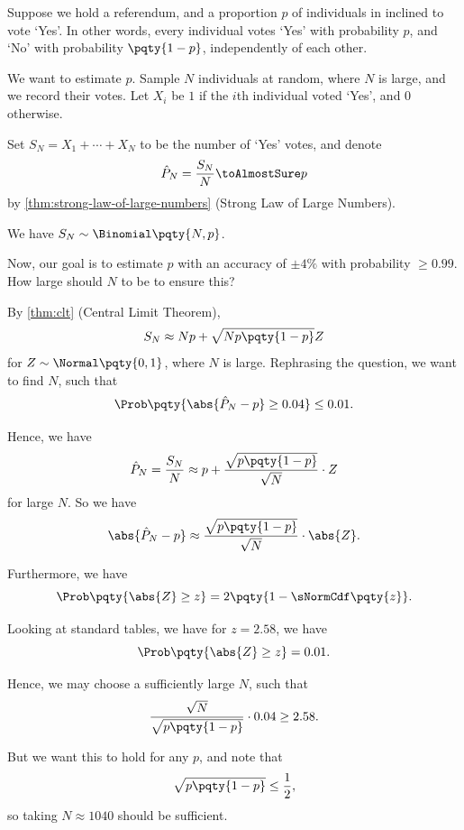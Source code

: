 \begin{example}
    Suppose we hold a referendum, and a proportion \(p\) of individuals in inclined to vote `Yes'. In other words, every individual votes `Yes' with probability \(p\), and `No' with probability \(\pqty{1 - p}\), independently of each other.

    We want to estimate \(p\). Sample \(N\) individuals at random, where \(N\) is large, and we record their votes. Let \(X_i\) be \(1\) if the \(i\)th individual voted `Yes', and \(0\) otherwise.

    Set \(S_N = X_1 + \cdots + X_N\) to be the number of `Yes' votes, and denote
    \[
        \hat{P}_N = \frac{S_N}{N} \toAlmostSure p
    \]
    by \autoref{thm:strong-law-of-large-numbers} (Strong Law of Large Numbers).
    
    We have \(S_N \sim \Binomial\pqty{N, p}\).
    
    Now, our goal is to estimate \(p\) with an accuracy of \(\pm 4\%\) with probability \(\geq 0.99\). How large should \(N\) to be to ensure this?

    By \autoref{thm:clt} (Central Limit Theorem),
    \[
        S_N \approx Np + \sqrt{N p \pqty{1 - p}} Z
    \]
    for \(Z \sim \Normal\pqty{0, 1}\), where \(N\) is large. Rephrasing the question, we want to find \(N\), such that
    \[
        \Prob\pqty{\abs{\hat{P}_N - p} \geq 0.04} \leq 0.01.
    \]

    Hence, we have
    \[
        \hat{P}_N = \frac{S_N}{N} \approx p + \frac{\sqrt{p \pqty{1 - p}}}{\sqrt{N}} \cdot Z
    \]  
    for large \(N\). So we have
    \[
        \abs{\hat{P}_N - p} \approx \frac{\sqrt{p \pqty{1 - p}}}{\sqrt{N}} \cdot \abs{Z}.
    \]

    Furthermore, we have
    \[
        \Prob\pqty{\abs{Z} \geq z} = 2 \pqty{1 - \sNormCdf\pqty{z}}.
    \]

    Looking at standard tables, we have for \(z = 2.58\), we have
    \[
        \Prob\pqty{\abs{Z} \geq z} = 0.01.
    \]

    Hence, we may choose a sufficiently large \(N\), such that
    \[
        \frac{\sqrt{N}}{\sqrt{p \pqty{1 - p}}} \cdot 0.04 \geq 2.58.
    \]

    But we want this to hold for any \(p\), and note that
    \[
        \sqrt{p \pqty{1 - p}} \leq \frac{1}{2},
    \]
    so taking \(N \approx 1040\) should be sufficient.
\end{example}